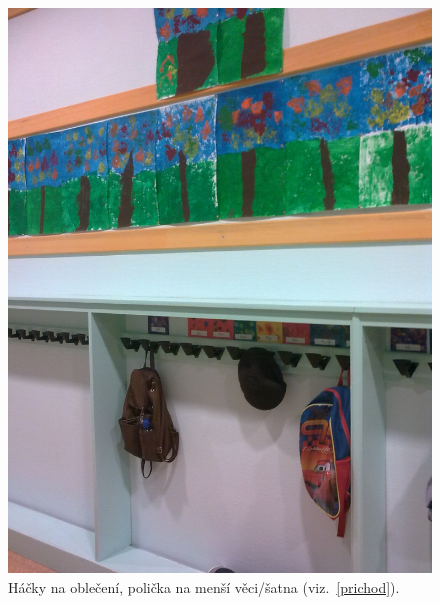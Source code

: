 	\begin{figure}[tb]
		\centering
		\includegraphics[height = 0.35\textheight]{./fotky/Obr9.jpg}
		\caption{
			Háčky na oblečení, polička na menší věci/šatna (viz.~\ref{prichod}).
		}
		\label{Obr9}
	\end{figure}


